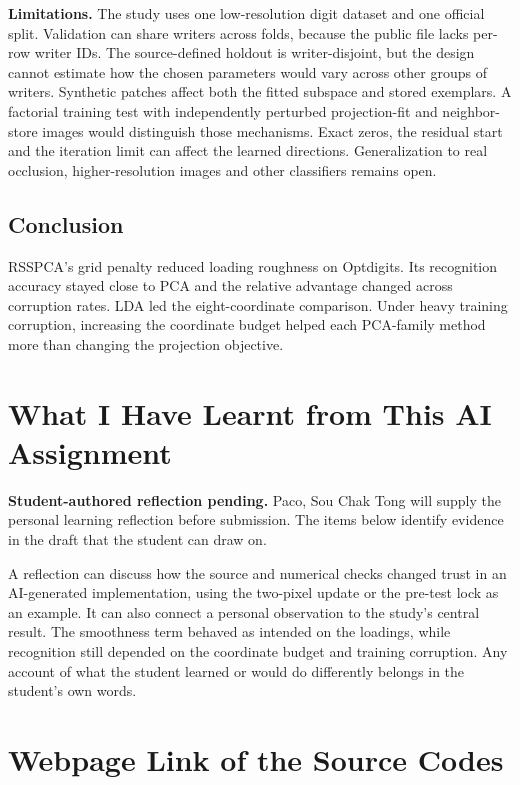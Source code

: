 \textbf{Limitations.}
The study uses one low-resolution digit dataset and one official split. Validation can share writers across folds, because the public file lacks per-row writer IDs. The source-defined holdout is writer-disjoint, but the design cannot estimate how the chosen parameters would vary across other groups of writers. Synthetic patches affect both the fitted subspace and stored exemplars. A factorial training test with independently perturbed projection-fit and neighbor-store images would distinguish those mechanisms. Exact zeros, the residual start and the iteration limit can affect the learned directions. Generalization to real occlusion, higher-resolution images and other classifiers remains open.

\clearpage
\subsection*{Conclusion}

RSSPCA's grid penalty reduced loading roughness on Optdigits. Its recognition accuracy stayed close to PCA and the relative advantage changed across corruption rates. LDA led the eight-coordinate comparison. Under heavy training corruption, increasing the coordinate budget helped each PCA-family method more than changing the projection objective.

\section{What I Have Learnt from This AI Assignment}

\noindent\colorbox{pale}{\parbox{\dimexpr\linewidth-2\fboxsep\relax}{%
\textbf{Student-authored reflection pending.} Paco, Sou Chak Tong will supply the personal learning reflection before submission. The items below identify evidence in the draft that the student can draw on.}}\par

A reflection can discuss how the source and numerical checks changed trust in an AI-generated implementation, using the two-pixel update or the pre-test lock as an example. It can also connect a personal observation to the study's central result. The smoothness term behaved as intended on the loadings, while recognition still depended on the coordinate budget and training corruption. Any account of what the student learned or would do differently belongs in the student's own words.

\section{Webpage Link of the Source Codes}


